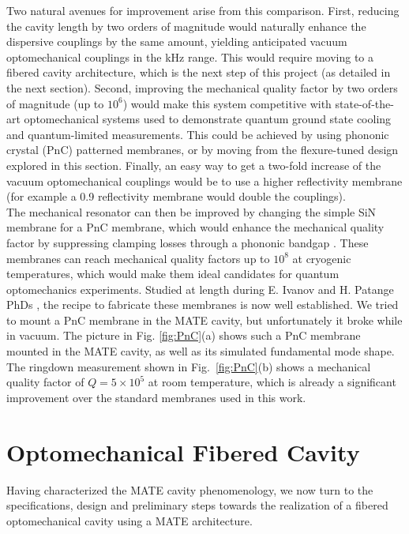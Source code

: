 Two natural avenues for improvement arise from this comparison. First, reducing the cavity length by two orders of magnitude would naturally enhance the dispersive couplings by the same amount, yielding anticipated vacuum optomechanical couplings in the kHz range. This would require moving to a fibered cavity architecture, which is the next step of this project (as detailed in the next section). Second, improving the mechanical quality factor by two orders of magnitude (up to $10^6$) would make this system competitive with state-of-the-art optomechanical systems used to demonstrate quantum ground state cooling and quantum-limited measurements. This could be achieved by using phononic crystal (PnC) patterned membranes, or by moving from the flexure-tuned design explored in this section. Finally, an easy way to get a two-fold increase of the vacuum optomechanical couplings would be to use a higher reflectivity membrane (for example a 0.9 reflectivity membrane would double the couplings). \\

The mechanical resonator can then be improved by changing the simple SiN membrane for a PnC membrane, which would enhance the mechanical quality factor by suppressing clamping losses through a phononic bandgap \cite{Tsaturyan2017}. These membranes can reach mechanical quality factors up to $10^8$ at cryogenic temperatures, which would make them ideal candidates for quantum optomechanics experiments. Studied at length during E. Ivanov and H. Patange PhDs \cite{ivanov,patange}, the recipe to fabricate these membranes is now well established. We tried to mount a PnC membrane in the MATE cavity, but unfortunately it broke while in vacuum. The picture in Fig. \ref{fig:PnC}(a) shows such a PnC membrane mounted in the MATE cavity, as well as its simulated fundamental mode shape. The ringdown measurement shown in Fig.~\ref{fig:PnC}(b) shows a mechanical quality factor of $Q = 5 \times 10^5$ at room temperature, which is already a significant improvement over the standard membranes used in this work. \\




\section{Optomechanical Fibered Cavity}
Having characterized the MATE cavity phenomenology, we now turn to the specifications, design and preliminary steps towards the realization of a fibered optomechanical cavity using a MATE architecture. \\

